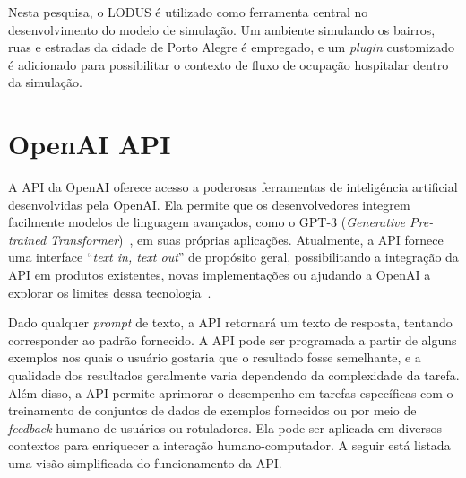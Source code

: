 Nesta pesquisa, o LODUS é utilizado como ferramenta central no desenvolvimento do modelo de simulação. Um ambiente simulando os bairros, ruas e estradas da cidade de Porto Alegre é empregado, e um \textit{plugin} customizado é adicionado para possibilitar o contexto de fluxo de ocupação hospitalar dentro da simulação.

\section{\label{sec:chat}OpenAI API}
A API da OpenAI oferece acesso a poderosas ferramentas de inteligência artificial desenvolvidas pela OpenAI. Ela permite que os desenvolvedores integrem facilmente modelos de linguagem avançados, como o GPT-3 (\textit{Generative Pre-trained Transformer})~\cite{brown2020language}, em suas próprias aplicações. %
Atualmente, a API fornece uma interface ``\textit{text in, text out}'' de propósito geral, possibilitando a integração da API em produtos existentes, novas implementações ou ajudando a OpenAI a explorar os limites dessa tecnologia~\cite{OPENAI}.

Dado qualquer \textit{prompt} de texto, a API retornará um texto de resposta, tentando corresponder ao padrão fornecido. A API pode ser programada a partir de alguns exemplos nos quais o usuário gostaria que o resultado fosse semelhante, e a qualidade dos resultados geralmente varia dependendo da complexidade da tarefa. Além disso, a API permite aprimorar o desempenho em tarefas específicas com o treinamento de conjuntos de dados de exemplos fornecidos ou por meio de \textit{feedback} humano de usuários ou rotuladores. Ela pode ser aplicada em diversos contextos para enriquecer a interação humano-computador. A seguir está listada uma visão simplificada do funcionamento da API.

